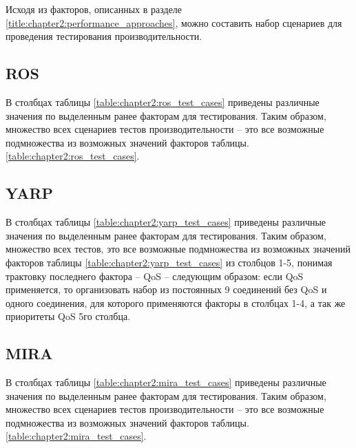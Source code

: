 Исходя из факторов, описанных в разделе \ref{title:chapter2:performance_approaches}, можно составить набор сценариев для проведения тестирования производительности.

\subsection{ROS}
В столбцах таблицы \ref{table:chapter2:ros_test_cases} приведены различные значения по выделенным ранее факторам для тестирования. Таким образом, множество всех сценариев тестов производительности -- это все возможные подмножества из возможных значений факторов таблицы. \ref{table:chapter2:ros_test_cases}.


\subsection{YARP}
В столбцах таблицы \ref{table:chapter2:yarp_test_cases} приведены различные значения по выделенным ранее факторам для тестирования. Таким образом, множество всех тестов, это все возможные подмножества из возможных значений факторов таблицы \ref{table:chapter2:yarp_test_cases} из столбцов 1-5, понимая трактовку последнего фактора -- QoS -- следующим образом: если QoS применяется, то организовать набор из постоянных 9 соединений без QoS и одного соединения, для которого применяются факторы в столбцах 1-4, а так же приоритеты QoS 5го столбца.


\subsection{MIRA}
В столбцах таблицы \ref{table:chapter2:mira_test_cases} приведены различные значения по выделенным ранее факторам для тестирования. Таким образом, множество всех сценариев тестов производительности -- это все возможные подмножества из возможных значений факторов таблицы. \ref{table:chapter2:mira_test_cases}.
